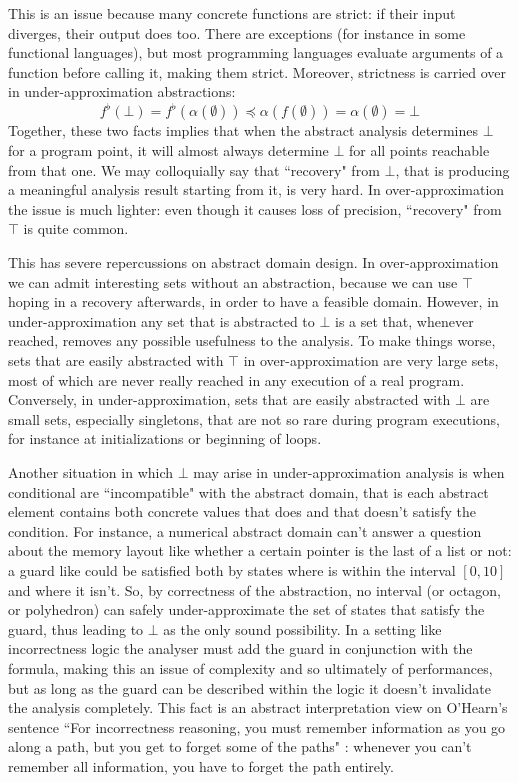 This is an issue because many concrete functions are strict: if their input diverges, their output does too. There are exceptions (for instance in some functional languages), but most programming languages evaluate arguments of a function before calling it, making them strict. Moreover, strictness is carried over in under-approximation abstractions:
\[
f^{\flat}(\bot) = f^{\flat}(\alpha(\emptyset)) \preceq \alpha(f(\emptyset)) = \alpha(\emptyset) = \bot
\]
Together, these two facts implies that when the abstract analysis determines $\bot$ for a program point, it will almost always determine $\bot$ for all points reachable from that one. We may colloquially say that ``recovery" from $\bot$, that is producing a meaningful analysis result starting from it, is very hard.
In over-approximation the issue is much lighter: even though it causes loss of precision, ``recovery" from $\top$ is quite common.

This has severe repercussions on abstract domain design. In over-approximation we can admit interesting sets without an abstraction, because we can use $\top$ hoping in a recovery afterwards, in order to have a feasible domain. However, in under-approximation any set that is abstracted to $\bot$ is a set that, whenever reached, removes any possible usefulness to the analysis.
To make things worse, sets that are easily abstracted with $\top$ in over-approximation are very large sets, most of which are never really reached in any execution of a real program. Conversely, in under-approximation, sets that are easily abstracted with $\bot$ are small sets, especially singletons, that are not so rare during program executions, for instance at initializations or beginning of loops.

Another situation in which $\bot$ may arise in under-approximation analysis is when conditional are ``incompatible" with the abstract domain, that is each abstract element contains both concrete values that does and that doesn't satisfy the condition.
For instance, a numerical abstract domain can't answer a question about the memory layout like whether a certain pointer is the last of a list or not: a guard like  could be satisfied both by states where  is within the interval $[0, 10]$ and where it isn't. So, by correctness of the abstraction, no interval (or octagon, or polyhedron) can safely under-approximate the set of states that satisfy the guard, thus leading to $\bot$ as the only sound possibility.
In a setting like incorrectness logic the analyser must add the guard in conjunction with the formula, making this an issue of complexity and so ultimately of performances, but as long as the guard can be described within the logic it doesn't invalidate the analysis completely. This fact is an abstract interpretation view on O'Hearn's sentence ``For incorrectness reasoning, you must remember information as you go along a path, but you get to forget some of the paths"\cite{ohearn-incorrectness-logic} : whenever you can't remember all information, you have to forget the path entirely.
